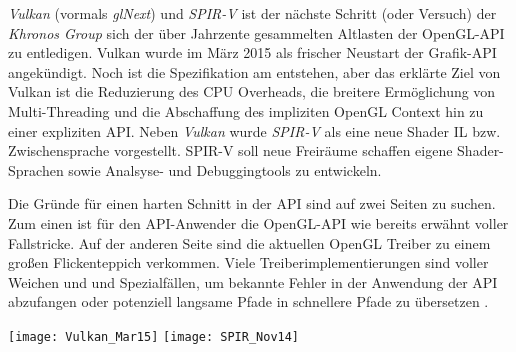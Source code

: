 \textit{Vulkan} (vormals \textit{glNext}) und \textit{SPIR-V} ist der nächste Schritt (oder Versuch) der \textit{Khronos Group} sich der über Jahrzente gesammelten Altlasten der OpenGL-API zu entledigen. Vulkan wurde im März 2015 als frischer Neustart der Grafik-API angekündigt. Noch ist die Spezifikation am entstehen, aber das erklärte Ziel von Vulkan ist die Reduzierung des CPU Overheads, die breitere Ermöglichung von Multi-Threading und die Abschaffung des impliziten OpenGL Context hin zu einer expliziten API. Neben \textit{Vulkan} wurde \textit{SPIR-V} als eine neue Shader \ac{IL} bzw. Zwischensprache vorgestellt. SPIR-V soll neue Freiräume schaffen eigene Shader-Sprachen sowie Analsyse- und Debuggingtools zu entwickeln\parencite{Olson2015}.

Die Gründe für einen harten Schnitt in der API sind auf zwei Seiten zu suchen. Zum einen ist für den API-Anwender die OpenGL-API wie bereits erwähnt voller Fallstricke. Auf der anderen Seite sind die aktuellen OpenGL Treiber zu einem großen Flickenteppich verkommen. Viele Treiberimplementierungen sind voller Weichen und und Spezialfällen, um bekannte Fehler in der Anwendung der API abzufangen oder potenziell langsame Pfade in schnellere Pfade zu übersetzen \parencite{gamedevnet:glnext}.

\begin{figure*}
\centering
	\texttt{[image: Vulkan\_Mar15]}
	\texttt{[image: SPIR\_Nov14]}
\end{figure*}


